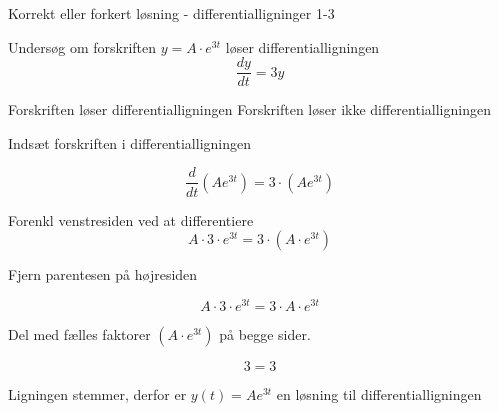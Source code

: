 \documentclass{article}
\begin{document}
\begin{exercise}{Korrekt eller forkert løsning - differentialligninger 1-3}
	
	
	Undersøg om forskriften $y = A \cdot e^{3t}$ løser differentialligningen
	\[
	\frac{dy}{dt} = 3y
	\]


\begin{multichoice}
	\itemtrue Forskriften løser differentialligningen 
	\itemfalse Forskriften løser ikke differentialligningen 
\end{multichoice}
	
	\hint
	
	Indsæt forskriften i differentialligningen
	
	\hint
	\[
	\frac{d}{dt} \left( A e^{3t}\right) = 3 \cdot \left( A e^{3t} \right)
	\]
	
	
	\hint
	
	Forenkl venstresiden ved at differentiere
	\[
	A \cdot 3 \cdot e^{3t} = 3 \cdot \left(A \cdot e^{3t} \right)
	\]
	
	\hint
	
	Fjern parentesen på højresiden
	
	\hint
	\[
	A \cdot 3 \cdot e^{3t} = 3 \cdot A \cdot e^{3t}
	\]
	
	\hint
	Del med fælles faktorer $\left( A \cdot e^{3t} \right)$ på begge sider.
	
	\hint
	
	\[
	3 = 3
	\]
	
	
	\hint
	
	Ligningen stemmer, derfor er $y(t) = A e^{3t}$ en løsning til differentialligningen
	
\end{exercise}

\newpage
\end{document}
